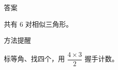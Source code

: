 \documentclass{exam-zh}
\begin{document}
\begin{eduBottomGrid}
  \begin{eduSummaryLeft}
    \begin{eduSummaryBlock}{\eduIconCheck}{答案}
    \begin{eduPlainList}
      \item 共有 $6$ 对相似三角形。    \end{eduPlainList}
    \end{eduSummaryBlock}
  \end{eduSummaryLeft}
  \eduSummaryDivider
  \begin{eduSummaryRight}
    \begin{eduSummaryBlock}{\eduIconPin}{方法提醒}
    \begin{eduBulletList}
      \item 标等角、找四个，用 $\dfrac{4\times3}{2}$ 握手计数。    \end{eduBulletList}
    \end{eduSummaryBlock}
  \end{eduSummaryRight}
\end{eduBottomGrid}
\end{document}
